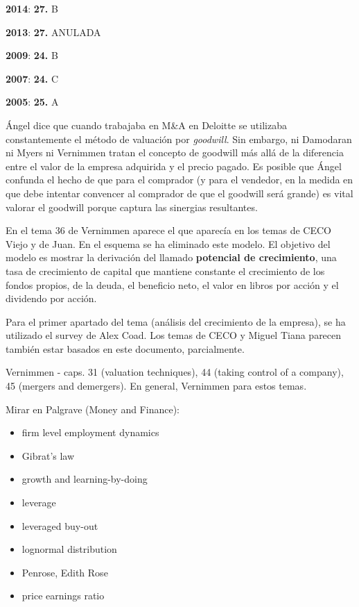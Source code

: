 \documentclass{nuevotema}
\begin{document}
\notas

\textbf{2014}: \textbf{27.} B

\textbf{2013}: \textbf{27.} ANULADA

\textbf{2009}: \textbf{24.} B

\textbf{2007}: \textbf{24.} C

\textbf{2005}: \textbf{25.} A


Ángel dice que cuando trabajaba en M\&A en Deloitte se utilizaba constantemente el método de valuación por \textit{goodwill}. Sin embargo, ni Damodaran ni Myers ni Vernimmen tratan el concepto de goodwill más allá de la diferencia entre el valor de la empresa adquirida y el precio pagado. Es posible que Ángel confunda el hecho de que para el comprador (y para el vendedor, en la medida en que debe intentar convencer al comprador de que el goodwill será grande) es vital valorar el goodwill porque captura las sinergias resultantes.

En el tema 36 de Vernimmen aparece el  que aparecía en los temas de CECO Viejo y de Juan. En el esquema se ha eliminado este modelo. El objetivo del modelo es mostrar la derivación del llamado \textbf{potencial de crecimiento}, una tasa de crecimiento de capital que mantiene constante el crecimiento de los fondos propios, de la deuda, el beneficio neto, el valor en libros por acción y el dividendo por acción.

\bibliografia

Para el primer apartado del tema (análisis del crecimiento de la empresa), se ha utilizado el survey de Alex Coad. Los temas de CECO y Miguel Tiana parecen también estar basados en este documento, parcialmente.

Vernimmen - caps. 31 (valuation techniques), 44 (taking control of a company), 45 (mergers and demergers). En general, Vernimmen para estos temas.

Mirar en Palgrave (Money and Finance):
\begin{itemize}
	\item firm level employment dynamics
	\item Gibrat's law
	\item growth and learning-by-doing
    \item leverage
    \item leveraged buy-out
    \item lognormal distribution
    \item Penrose, Edith Rose
    \item price earnings ratio
\end{itemize}
\end{document}
